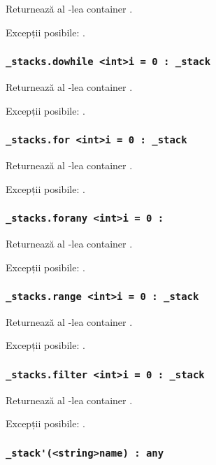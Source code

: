 Returnează al -lea container .

Excepții posibile: .

\subsubsection{\lstinline|_stacks.dowhile <int>i = 0 : _stack|}

Returnează al -lea container .

Excepții posibile: .

\subsubsection{\lstinline|_stacks.for <int>i = 0 : _stack|}

Returnează al -lea container .

Excepții posibile: .

\subsubsection{\lstinline|_stacks.forany <int>i = 0 : |}

Returnează al -lea container .

Excepții posibile: .

\subsubsection{\lstinline|_stacks.range <int>i = 0 : _stack|}

Returnează al -lea container .

Excepții posibile: .

\subsubsection{\lstinline|_stacks.filter <int>i = 0 : _stack|}

Returnează al -lea container .

Excepții posibile: .

\subsubsection{\lstinline|_stack'(<string>name) : any|}

